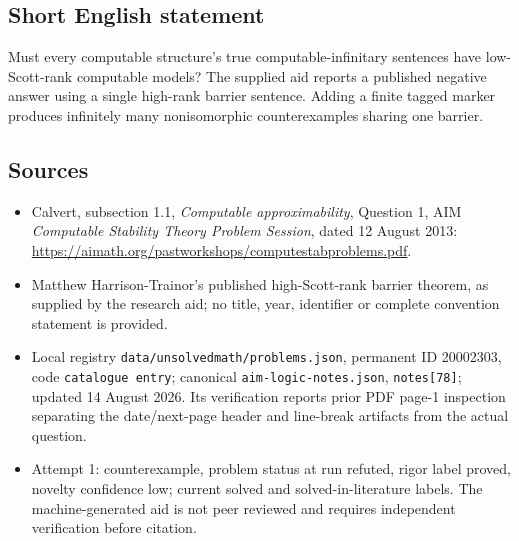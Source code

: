 \documentclass[11pt]{article}
\begin{document}
\subsection{Short English statement}
Must every computable structure's true computable-infinitary sentences have low-Scott-rank computable models? The supplied aid reports a published negative answer using a single high-rank barrier sentence. Adding a finite tagged marker produces infinitely many nonisomorphic counterexamples sharing one barrier.
\subsection{Sources}
\begin{itemize}
\item Calvert, subsection 1.1, \emph{Computable approximability}, Question 1, AIM \emph{Computable Stability Theory Problem Session}, dated 12 August 2013: \url{https://aimath.org/pastworkshops/computestabproblems.pdf}.
\item Matthew Harrison-Trainor's published high-Scott-rank barrier theorem, as supplied by the research aid; no title, year, identifier or complete convention statement is provided.
\item Local registry \texttt{data/unsolvedmath/problems.json}, permanent ID 20002303, code \texttt{catalogue entry}; canonical \texttt{aim-logic-notes.json}, \texttt{notes[78]}; updated 14 August 2026. Its verification reports prior PDF page-1 inspection separating the date/next-page header and line-break artifacts from the actual question.
\item Attempt 1: counterexample, problem status at run refuted, rigor label proved, novelty confidence low; current solved and solved-in-literature labels. The machine-generated aid is not peer reviewed and requires independent verification before citation.
\end{itemize}
\end{document}
